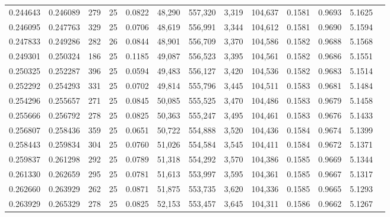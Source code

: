 \begin{tabular}{rrrrrrrrrrrrr}
0.244643 & 0.246089 &   279 &  25 &                                     0.0822 &  48,290 & 557,320 &   3,319 & 104,637 & 0.1581 & 0.9693 & 5.1625 \\
0.246095 & 0.247763 &   329 &  25 &                                     0.0706 &  48,619 & 556,991 &   3,344 & 104,612 & 0.1581 & 0.9690 & 5.1594 \\
0.247833 & 0.249286 &   282 &  26 &                                     0.0844 &  48,901 & 556,709 &   3,370 & 104,586 & 0.1582 & 0.9688 & 5.1568 \\
0.249301 & 0.250324 &   186 &  25 &                                     0.1185 &  49,087 & 556,523 &   3,395 & 104,561 & 0.1582 & 0.9686 & 5.1551 \\
0.250325 & 0.252287 &   396 &  25 &                                     0.0594 &  49,483 & 556,127 &   3,420 & 104,536 & 0.1582 & 0.9683 & 5.1514 \\
0.252292 & 0.254293 &   331 &  25 &                                     0.0702 &  49,814 & 555,796 &   3,445 & 104,511 & 0.1583 & 0.9681 & 5.1484 \\
0.254296 & 0.255657 &   271 &  25 &                                     0.0845 &  50,085 & 555,525 &   3,470 & 104,486 & 0.1583 & 0.9679 & 5.1458 \\
0.255666 & 0.256792 &   278 &  25 &                                     0.0825 &  50,363 & 555,247 &   3,495 & 104,461 & 0.1583 & 0.9676 & 5.1433 \\
0.256807 & 0.258436 &   359 &  25 &                                     0.0651 &  50,722 & 554,888 &   3,520 & 104,436 & 0.1584 & 0.9674 & 5.1399 \\
0.258443 & 0.259834 &   304 &  25 &                                     0.0760 &  51,026 & 554,584 &   3,545 & 104,411 & 0.1584 & 0.9672 & 5.1371 \\
0.259837 & 0.261298 &   292 &  25 &                                     0.0789 &  51,318 & 554,292 &   3,570 & 104,386 & 0.1585 & 0.9669 & 5.1344 \\
0.261330 & 0.262659 &   295 &  25 &                                     0.0781 &  51,613 & 553,997 &   3,595 & 104,361 & 0.1585 & 0.9667 & 5.1317 \\
0.262660 & 0.263929 &   262 &  25 &                                     0.0871 &  51,875 & 553,735 &   3,620 & 104,336 & 0.1585 & 0.9665 & 5.1293 \\
0.263929 & 0.265329 &   278 &  25 &                                     0.0825 &  52,153 & 553,457 &   3,645 & 104,311 & 0.1586 & 0.9662 & 5.1267 \\

\end{tabular}

